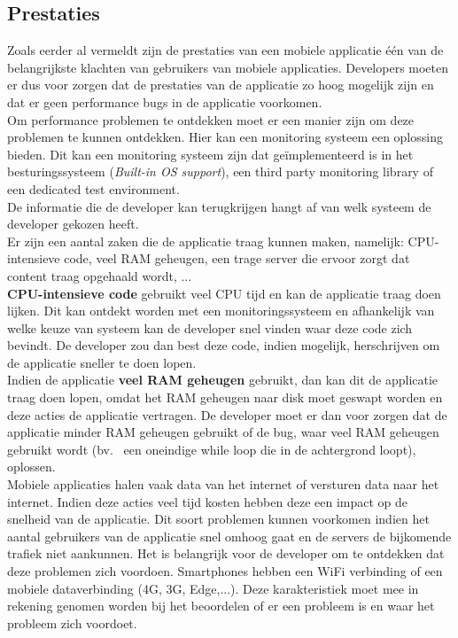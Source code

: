 \subsection{Prestaties}
Zoals eerder al vermeldt zijn de prestaties van een mobiele applicatie \'e\'en van de belangrijkste klachten van gebruikers van mobiele applicaties. Developers moeten er dus voor zorgen dat de prestaties van de applicatie zo hoog mogelijk zijn en dat er geen performance bugs in de applicatie voorkomen. \\

Om performance problemen te ontdekken moet er een manier zijn om deze problemen te kunnen ontdekken. Hier kan een monitoring systeem een oplossing bieden. Dit kan een monitoring systeem zijn dat ge\"implementeerd is in het besturingssysteem (\textit{Built-in OS support}), een third party monitoring library of een dedicated test environment.  \\
De informatie die de developer kan terugkrijgen hangt af van welk systeem de developer gekozen heeft.\\

Er zijn een aantal zaken die de applicatie traag kunnen maken, namelijk: CPU-intensieve code, veel RAM geheugen,  een trage server die ervoor zorgt dat content traag opgehaald wordt, ... \\

\textbf{CPU-intensieve code} gebruikt veel CPU tijd en kan de applicatie traag doen lijken. Dit kan ontdekt worden met een monitoringssysteem en afhankelijk van welke keuze van systeem kan de developer snel vinden waar deze code zich bevindt. De developer zou dan best deze code, indien mogelijk, herschrijven om de applicatie sneller te doen lopen. \\

Indien de applicatie \textbf{veel RAM geheugen} gebruikt, dan kan dit de applicatie traag doen lopen, omdat het RAM geheugen naar disk moet geswapt worden en deze acties de applicatie vertragen. De developer moet er dan voor zorgen dat de applicatie minder RAM geheugen gebruikt of de bug, waar veel RAM geheugen gebruikt wordt (bv.~ een oneindige while loop die in de achtergrond loopt), oplossen. \\

Mobiele applicaties halen vaak data van het internet of versturen data naar het internet. Indien deze acties veel tijd kosten hebben deze een impact op de snelheid van de applicatie. Dit soort problemen kunnen voorkomen indien het aantal gebruikers van de applicatie snel omhoog gaat en de servers de bijkomende trafiek niet aankunnen. Het is belangrijk voor de developer om te ontdekken dat deze problemen zich voordoen. Smartphones hebben een WiFi verbinding of een mobiele dataverbinding (4G, 3G, Edge,...). Deze karakteristiek moet mee in rekening genomen worden bij het beoordelen of er een probleem is en waar het probleem zich voordoet.\\



